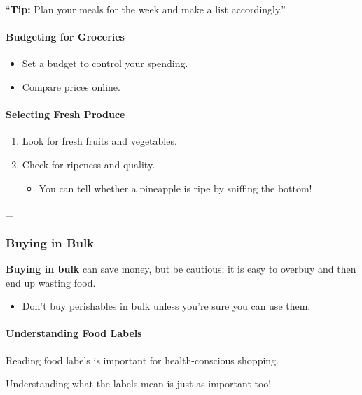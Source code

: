 \documentclass{article}
\begin{document}
\enquote{\textbf{Tip:} Plan your meals for the week and make a list accordingly.}


\paragraph{Budgeting for Groceries}


\begin{itemize}
    \item Set a budget to control your spending.
    \item Compare prices online.
\end{itemize}


\paragraph{Selecting Fresh Produce}


\begin{enumerate}
    \item Look for fresh fruits and vegetables.
    \item Check for ripeness and quality.
\begin{itemize}
    \item You can tell whether a pineapple is ripe by sniffing the bottom!
\end{itemize}
\end{enumerate}


\_\hrulefill


\subsubsection{Buying in Bulk}


\textbf{Buying in bulk} can save money, but be cautious; it is easy to overbuy and then end up wasting food.


\begin{itemize}
    \item Don't buy perishables in bulk unless you're sure you can use them.
\end{itemize}


\paragraph{Understanding Food Labels}


Reading food labels is important for health-conscious shopping.

Understanding what the labels mean is just as important too!
\end{document}
